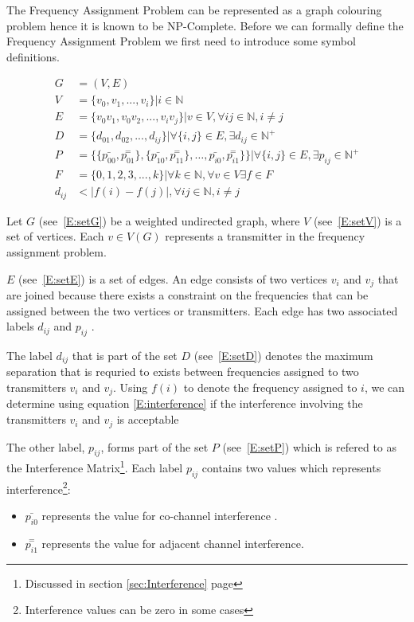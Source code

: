 The Frequency Assignment Problem can be represented as a graph colouring problem hence it is known to be NP-Complete. Before we can formally define the Frequency Assignment Problem we first need to introduce some symbol definitions.

\begin{align}
	G &= (V,E) \label{E:setG}\\
	V &= \{v_{0},v_{1},...,v_{i}\} | i \in \mathbb{N} \label{E:setV}\\
	E &= \{v_0v_1,v_0v_2,...,v_iv_j\}|v \in V,\forall ij \in \mathbb{N},i \neq j \label{E:setE}\\
	D &= \{d_{01},d_{02},...,d_{ij}\}| \forall\{i,j\} \in E, \exists d_{ij} \in \mathbb{N}^+ \label{E:setD}\\
	P &= \{\{\bar{p_{00}},\overset{=}{p_{01}}\},\{\bar{p_{10}},\overset{=}{p_{11}}\},\ldots,\bar{p_{i0}},\overset{=}{p_{i1}}\}\}| \forall \{i,j\} \in E,\exists p_{ij} \in \mathbb{N}^+ \label{E:setP}\\
	F &= \{0,1,2,3,...,k\}| \forall k \in \mathbb{N},\forall v \in V \exists f \in F\label{E:setF}\\
	d_{ij} &< |f(i) - f(j)|, \forall ij \in \mathbb{N},i \neq j \label{E:interference}
\end{align}

Let $G$ (see~\ref{E:setG}) be a weighted undirected graph, where $V$ (see~\ref{E:setV}) is a set of vertices. Each $v \in V(G)$ represents a transmitter in the frequency assignment problem. 

$E$ (see~\ref{E:setE}) is a set of edges. An edge consists of two vertices $v_i$ and $v_j$ that are joined because there exists a constraint on the frequencies that can be assigned between the two vertices or transmitters. Each edge has two associated labels $d_{ij}$ and $p_{ij}$ \cite{FAPOrientationModel,TabuMontemanniSmith}. 

The label $d_{ij}$ that is part of the set $D$ (see~\ref{E:setD}) denotes the maximum separation that is requried to exists between frequencies assigned to two transmitters $v_i$ and $v_j$. Using $f(i)$ to denote the frequency assigned to $i$, we can determine using equation \ref{E:interference} if the interference involving the transmitters $v_i$ and $v_j$ is acceptable\cite{FAPOrientationModel,TabuMontemanniSmith}

The other label, $p_{ij}$, forms part of the set $P$ (see~\ref{E:setP}) which is refered to as the Interference Matrix\footnote{Discussed in section \ref{sec:Interference} page \pageref{sec:Interference}}. Each label $p_{ij}$ contains two values which represents interference\footnote{Interference values can be zero in some cases}:
\begin{itemize}
\item $\bar{p_{i0}}$ represents the value for co-channel interference \cite{FAPOrientationModel,TabuMontemanniSmith}. 
\item $\overset{=}{p_{i1}}$ represents the value for adjacent channel interference\cite{FAPOrientationModel,TabuMontemanniSmith}.
\end{itemize}

